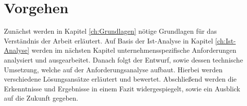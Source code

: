 \section{Vorgehen}


Zunächst werden in Kapitel \ref{ch:Grundlagen} nötige Grundlagen für das Verständnis der Arbeit erläutert. Auf Basis der Ist-Analyse in Kapitel \ref{ch:Ist-Analyse} werden im nächsten Kapitel unternehmensspezifische Anforderungen analysiert und ausgearbeitet. Danach folgt der Entwurf, sowie dessen technische Umsetzung, welche auf der Anforderungsanalyse aufbaut. Hierbei werden verschiedene Lösungsansätze erläutert und bewertet. Abschließend werden die Erkenntnisse und Ergebnisse in einem Fazit widergespiegelt, sowie ein Ausblick auf die Zukunft gegeben.